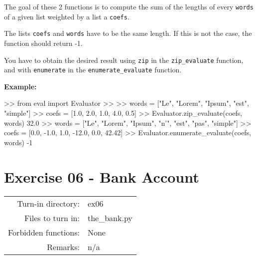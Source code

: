 \documentclass[]{article}
\newenvironment{Shaded}{\begin{snugshade}}{\end{snugshade}}
\newcommand{\BuiltInTok}[1]{\textcolor[rgb]{0.50,0.55,0.55}{#1}}
\newcommand{\DecValTok}[1]{\textcolor[rgb]{0.96,0.45,0.00}{#1}}
\newcommand{\FloatTok}[1]{\textcolor[rgb]{0.96,0.45,0.00}{#1}}
\newcommand{\ImportTok}[1]{\textcolor[rgb]{0.15,0.68,0.38}{#1}}
\newcommand{\NormalTok}[1]{\textcolor[rgb]{0.81,0.81,0.76}{#1}}
\newcommand{\OperatorTok}[1]{\textcolor[rgb]{0.81,0.81,0.76}{#1}}
\newcommand{\StringTok}[1]{\textcolor[rgb]{0.96,0.31,0.31}{#1}}
\begin{document}
The goal of these 2 functions is to compute the sum of the lengths of
every \texttt{words} of a given list weighted by a list a
\texttt{coefs}.

The lists \texttt{coefs} and \texttt{words} have to be the same length.
If this is not the case, the function should return -1.

You have to obtain the desired result using \texttt{zip} in the
\texttt{zip\_evaluate} function, and with \texttt{enumerate} in the
\texttt{enumerate\_evaluate} function.

\textbf{Example:}

\begin{Shaded}
\begin{Highlighting}[]
\OperatorTok{>>} \ImportTok{from} \BuiltInTok{eval} \ImportTok{import}\NormalTok{ Evaluator}
\OperatorTok{>>} 
\OperatorTok{>>}\NormalTok{ words }\OperatorTok{=}\NormalTok{ [}\StringTok{"Le"}\NormalTok{, }\StringTok{"Lorem"}\NormalTok{, }\StringTok{"Ipsum"}\NormalTok{, }\StringTok{"est"}\NormalTok{, }\StringTok{"simple"}\NormalTok{]}
\OperatorTok{>>}\NormalTok{ coefs }\OperatorTok{=}\NormalTok{ [}\FloatTok{1.0}\NormalTok{, }\FloatTok{2.0}\NormalTok{, }\FloatTok{1.0}\NormalTok{, }\FloatTok{4.0}\NormalTok{, }\FloatTok{0.5}\NormalTok{]}
\OperatorTok{>>}\NormalTok{ Evaluator.zip_evaluate(coefs, words)}
\FloatTok{32.0}
\OperatorTok{>>}\NormalTok{ words }\OperatorTok{=}\NormalTok{ [}\StringTok{"Le"}\NormalTok{, }\StringTok{"Lorem"}\NormalTok{, }\StringTok{"Ipsum"}\NormalTok{, }\StringTok{"n'"}\NormalTok{, }\StringTok{"est"}\NormalTok{, }\StringTok{"pas"}\NormalTok{, }\StringTok{"simple"}\NormalTok{]}
\OperatorTok{>>}\NormalTok{ coefs }\OperatorTok{=}\NormalTok{ [}\FloatTok{0.0}\NormalTok{, }\FloatTok{-1.0}\NormalTok{, }\FloatTok{1.0}\NormalTok{, }\FloatTok{-12.0}\NormalTok{, }\FloatTok{0.0}\NormalTok{, }\FloatTok{42.42}\NormalTok{]}
\OperatorTok{>>}\NormalTok{ Evaluator.enumerate_evaluate(coefs, words)}
\DecValTok{-1}
\end{Highlighting}
\end{Shaded}

\clearpage

\hypertarget{exercise-06---bank-account-1}{%
\section{Exercise 06 - Bank
Account}\label{exercise-06---bank-account-1}}

\begin{longtable}[]{@{}rl@{}}
\toprule
\endhead
Turn-in directory: & ex06\tabularnewline
Files to turn in: & the\_bank.py\tabularnewline
Forbidden functions: & None\tabularnewline
Remarks: & n/a\tabularnewline
\bottomrule
\end{longtable}
\end{document}
